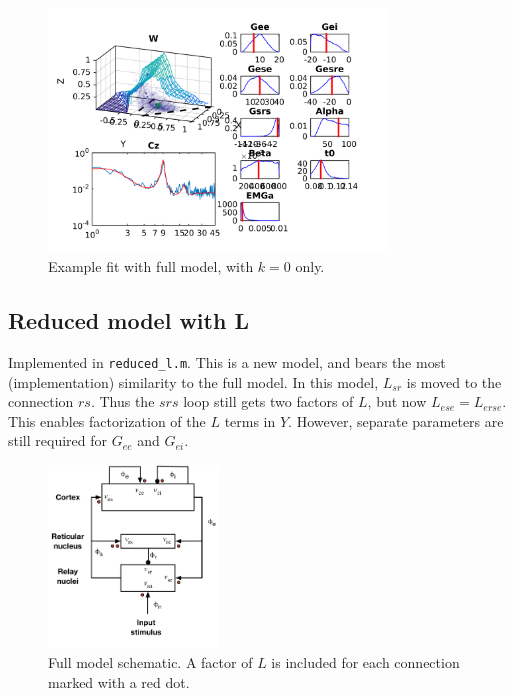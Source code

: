 \documentclass[10pt,a4paper]{article}
\begin{document}
\begin{figure}[h!]
\begin{center}
\includegraphics[width=0.8\textwidth]{example_full_k0}
\caption{Example fit with full model, with $k=0$ only.}
\label{fig:full}
\end{center}
\end{figure}

\clearpage

\subsection{Reduced model with L}
Implemented in {\tt reduced\_l.m}. This is a new model, and bears the most (implementation) similarity to the full model. In this model, $L_{sr}$ is moved to the connection $rs$. Thus the $srs$ loop still gets two factors of $L$, but now $L_{ese} = L_{erse}$. This enables factorization of the $L$ terms in $Y$. However, separate parameters are still required for $G_{ee}$ and $G_{ei}$. 

\begin{figure}[h!]
\begin{center}
\includegraphics[width=0.4\textwidth]{reduced_l}
\caption{Full model schematic. A factor of $L$ is included for each connection marked with a red dot.}
\label{fig:full}
\end{center}
\end{figure}
\end{document}
